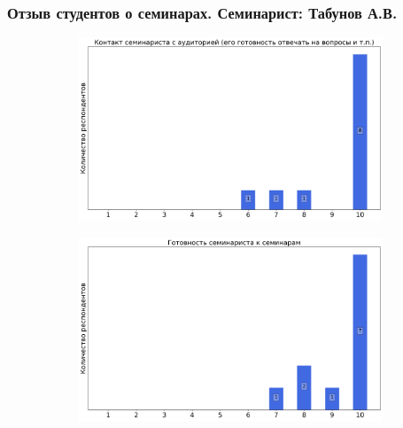     \subsubsection{Отзыв студентов о семинарах. Семинарист: Табунов А.В.}
        \begin{figure}[H]
            \centering
            \begin{subfigure}[b]{0.45\textwidth}
                \centering
                \includegraphics[width=\textwidth]{images/1 course/Дискретный анализ/seminarists-marks-Табунов А.В.-0.png}
            \end{subfigure}
            \begin{subfigure}[b]{0.45\textwidth}
                \centering
                \includegraphics[width=\textwidth]{images/1 course/Дискретный анализ/seminarists-marks-Табунов А.В.-1.png}
            \end{subfigure}
            \begin{subfigure}[b]{0.45\textwidth}
                \centering

\end{subfigure}
\end{figure}
